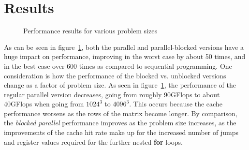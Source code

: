 \documentclass[letterpaper,twocolumn,10pt]{article}
\begin{document}
\section{Results}
\begin{figure}
  \caption{\label{fig:comp} Performance results for various problem sizes}
\end{figure}
As can be seen in figure~\ref{fig:comp}, both the parallel and parallel-blocked
versions have a huge impact on performance, improving in the worst case by about 50 times,
and in the best case over 600 times as compared to sequential programming. One
consideration is how the performance of the blocked vs. unblocked versions change
as a factor of problem size. As seen in figure~\ref{fig:comp}, the performance of
the regular parallel version decreases, going from roughly 90GFlops to about 40GFlops
when going from $1024^3$ to $4096^3$. This occurs because the cache performance worsens
as the rows of the matrix become longer. By comparison, the \textit{blocked parallel}
performance improves as the problem size increases, as the improvements of the
cache hit rate make up for the increased number of jumps and register values
required for the further nested \textbf{for} loops.
\end{document}
